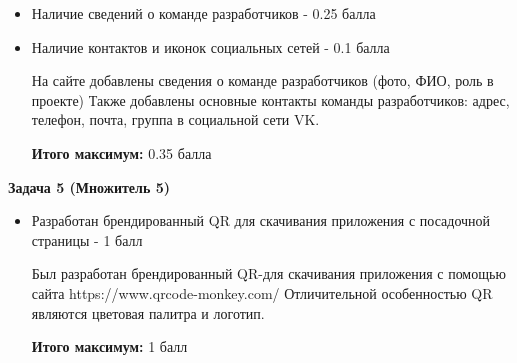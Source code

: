 \begin{itemize}
    \item Наличие сведений о команде разработчиков - 0.25 балла
    \item Наличие контактов и иконок социальных сетей - 0.1 балла
    
    На сайте добавлены сведения о команде разработчиков (фото, ФИО, роль в проекте)
    Также добавлены основные контакты команды разработчиков: адрес, телефон, почта, группа в социальной сети VK.

    \textbf{Итого максимум:} 0.35 балла
\end{itemize}

\textbf{Задача 5 (Множитель 5)}

\begin{itemize}
    \item Разработан брендированный QR для скачивания приложения с посадочной страницы - 1 балл

    Был разработан брендированный QR-для скачивания приложения с помощью сайта https://www.qrcode-monkey.com/
    Отличительной особенностью QR являются цветовая палитра и логотип.
    

    \textbf{Итого максимум:} 1 балл
\end{itemize}